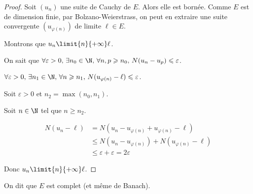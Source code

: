 \begin{proof}
    Soit $(u_n)$ une suite de Cauchy de $E$. Alors elle est bornée. 
    Comme $E$ est de dimension finie, par Bolzano-Weierstrass, on peut en extraire
    une suite convergente $(u_{\varphi(n)})$ de limite $\ell \in E$.

    Montrons que $u_n \limit{n}{+\infty} \ell$.

    On sait que $\forall \varepsilon > 0, \, \exists n_0 \in \N, \, \forall n, p \geqslant n_0, \, N(u_n - u_p) \leqslant \varepsilon$. 

    $\forall \varepsilon > 0, \, \exists n_1 \in \N, \, \forall n \geqslant n_1, \, N(u_{\varphi(n)} - \ell) \leqslant \varepsilon$.

    Soit $\varepsilon > 0$ et $n_2 = \max(n_0, n_1)$.

    Soit $n \in \N$ tel que $n \geqslant n_2$.

    \begin{align*}
        N(u_n - \ell) & = N(u_n - u_{\varphi(n)} + u_{\varphi(n)} - \ell) \\
        & \leqslant N(u_n - u_{\varphi(n)}) + N(u_{\varphi(n)} - \ell) \\
        & \leqslant \varepsilon + \varepsilon = 2 \varepsilon
    \end{align*}

    Donc $u_n \limit{n}{+\infty} \ell$.
\end{proof}

\begin{remarque}
    On dit que $E$ est complet (et même de Banach).
\end{remarque}
